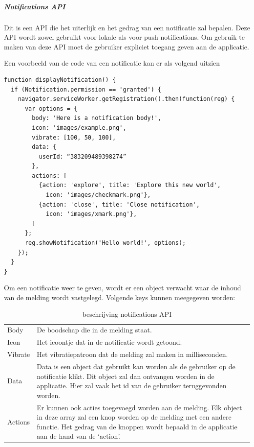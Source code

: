 \subparagraph{Notifications API}
Dit is een API die het uiterlijk en het gedrag van een notificatie zal bepalen. Deze API wordt zowel gebruikt voor lokale als voor push notifications.
Om gebruik te maken van deze API moet de gebruiker expliciet toegang geven aan de applicatie.

Een voorbeeld van de code van een notificatie kan er als volgend uitzien



\begin{lstlisting}
function displayNotification() {
  if (Notification.permission == 'granted') {
    navigator.serviceWorker.getRegistration().then(function(reg) {
      var options = {
        body: 'Here is a notification body!',
        icon: 'images/example.png',
        vibrate: [100, 50, 100],
        data: {
          userId: “383209489398274”
        },
        actions: [
          {action: 'explore', title: 'Explore this new world',
            icon: 'images/checkmark.png'},
          {action: 'close', title: 'Close notification',
            icon: 'images/xmark.png'},
        ]
      };
      reg.showNotification('Hello world!', options);
    });
  }
}
\end{lstlisting}


Om een notificatie weer te geven, wordt er een object verwacht waar de inhoud van de melding wordt vastgelegd. Volgende keys kunnen meegegeven worden:


\begin{table}[]
\begin{tabular}{ll}
Body    & De boodschap die in de melding staat.\\
Icon    & Het icoontje dat in de notificatie wordt getoond.\\
Vibrate & Het vibratiepatroon dat de melding zal maken in milliseconden.\\
Data    & Data is een object dat gebruikt kan worden als de gebruiker op de notificatie klikt. Dit object zal dan ontvangen worden in de applicatie. Hier zal vaak het id van de gebruiker teruggevonden worden.\\
Actions & Er kunnen ook acties toegevoegd worden aan de melding. Elk object in deze array zal een knop worden op de melding met een andere functie. Het gedrag van de knoppen wordt bepaald in de applicatie aan de hand van de ‘action’.
\end{tabular}
\caption{beschrijving notifications API}
\label{tab:notificatie code}
\end{table}

